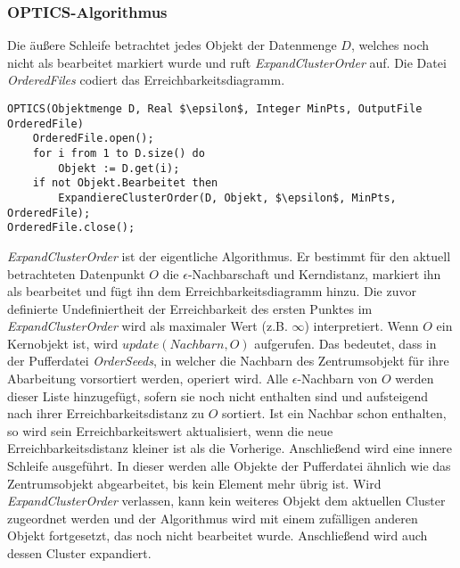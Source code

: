 \documentclass[11pt,ceqn]{book}
\begin{document}
\subsubsection{OPTICS-Algorithmus}

Die äußere Schleife betrachtet jedes Objekt der Datenmenge $D$, welches noch nicht als bearbeitet markiert wurde und ruft \textit{ExpandClusterOrder} auf. Die Datei \textit{OrderedFiles} codiert das Erreichbarkeitsdiagramm.
\begin{minipage}{\linewidth} %
\begin{lstlisting}[frame=single,mathescape=true]
OPTICS(Objektmenge D, Real $\epsilon$, Integer MinPts, OutputFile OrderedFile)
	OrderedFile.open();
	for i from 1 to D.size() do
		Objekt := D.get(i);
	if not Objekt.Bearbeitet then
		ExpandiereClusterOrder(D, Objekt, $\epsilon$, MinPts, OrderedFile);
OrderedFile.close();
\end{lstlisting}
\end{minipage}


\textit{ExpandClusterOrder} ist der eigentliche Algorithmus. Er bestimmt für den aktuell betrachteten Datenpunkt $O$ die $\epsilon$-Nachbarschaft und Kerndistanz, markiert ihn als bearbeitet und fügt ihn dem Erreichbarkeitsdiagramm hinzu. Die zuvor definierte Undefiniertheit der Erreichbarkeit des ersten Punktes im \textit{ExpandClusterOrder} wird als maximaler Wert (z.B. $\infty$) interpretiert. Wenn $O$ ein Kernobjekt ist, wird $update(Nachbarn, O)$ aufgerufen. Das bedeutet, dass in der Pufferdatei \textit{OrderSeeds}, in welcher die Nachbarn des Zentrumsobjekt für ihre Abarbeitung vorsortiert werden, operiert wird. Alle $\epsilon$-Nachbarn von $O$ werden dieser Liste hinzugefügt, sofern sie noch nicht enthalten sind und aufsteigend nach ihrer Erreichbarkeitsdistanz zu $O$ sortiert. Ist ein Nachbar schon enthalten, so wird sein Erreichbarkeitswert aktualisiert, wenn die neue Erreichbarkeitsdistanz kleiner ist als die Vorherige.
Anschließend wird eine innere Schleife ausgeführt. In dieser werden alle Objekte der Pufferdatei ähnlich wie das Zentrumsobjekt abgearbeitet, bis kein Element mehr übrig ist. Wird \textit{ExpandClusterOrder} verlassen, kann kein weiteres Objekt dem aktuellen Cluster zugeordnet werden und der Algorithmus wird mit einem zufälligen anderen Objekt fortgesetzt, das noch nicht bearbeitet wurde. Anschließend wird auch dessen Cluster expandiert.
\end{document}
